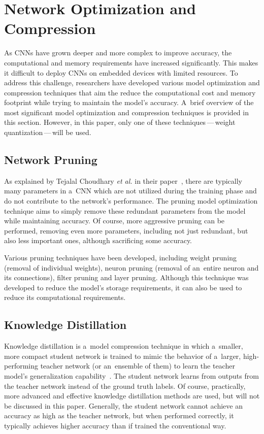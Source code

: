 \section{Network Optimization and Compression}

As CNNs have grown deeper and more complex to improve accuracy, the
computational and memory requirements have increased significantly. This makes
it difficult to deploy CNNs on embedded devices with limited resources. To
address this challenge, researchers have developed various model optimization
and compression techniques that aim the reduce the computational cost and memory
footprint while trying to maintain the model's accuracy. A~brief overview of the
most significant model optimization and compression techniques is provided in
this section. However, in this paper, only one of these techniques\,---\,weight
quantization\,---\,will be used.


\subsection{Network Pruning}

As explained by Tejalal Choudhary \textit{et al.} in their
paper~\cite{Choudhary2020}, there are typically many parameters in a~CNN which
are not utilized during the training phase and do not contribute to the
network's performance. The pruning model optimization technique aims to simply
remove these redundant parameters from the model while maintaining accuracy. Of
course, more aggressive pruning can be performed, removing even more parameters,
including not just redundant, but also less important ones, although
sacrificing some accuracy.

Various pruning techniques have been developed, including weight pruning
(removal of individual weights), neuron pruning (removal of an~entire neuron and
its connections), filter pruning and layer pruning. Although this technique was
developed to reduce the model's storage requirements, it can also be used to
reduce its computational requirements.


\subsection{Knowledge Distillation}

Knowledge distillation is a~model compression technique in which a~smaller, more
compact student network is trained to mimic the behavior of a~larger,
high-performing teacher network (or an~ensemble of them) to learn the teacher
model's generalization capability~\cite{Gou2021}. The student network learns
from outputs from the teacher network instead of the ground truth labels. Of
course, practically, more advanced and effective knowledge distillation methods
are used, but will not be discussed in this paper. Generally, the student
network cannot achieve an accuracy as high as the teacher network, but when
performed correctly, it typically achieves higher accuracy than if trained the
conventional way.


